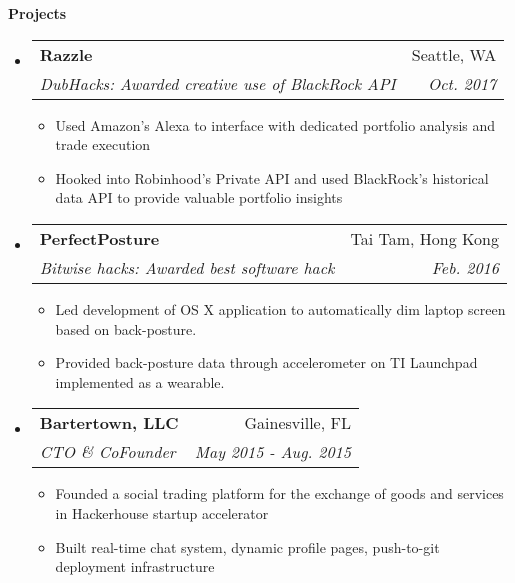 \documentclass[letterpaper,10pt]{article}
\makeatletter
\newcommand{\resitem}[1]{\item #1 \vspace{-2pt}}
\newcommand{\resheading}[1]{{\large \colorbox{mygrey}{\begin{minipage}{\textwidth}{\textbf{#1 \vphantom{p\^{E}}}}\end{minipage}}}}
\newcommand{\ressubheading}[4]{
\begin{tabular*}{7.0in}{l@{\extracolsep{\fill}}r}
		\textbf{#1} & #2 \\
		\textit{#3} & \textit{#4} \\
\end{tabular*}\vspace{-6pt}}
\makeatother
\begin{document}
\resheading{Projects}
\begin{itemize}
\item
	\ressubheading{Razzle}{Seattle, WA}{DubHacks: Awarded creative use of BlackRock API}{Oct. 2017}
	\begin{itemize}
		\resitem{Used Amazon's Alexa to interface with dedicated portfolio analysis and trade execution}
		\resitem{Hooked into Robinhood's Private API and used BlackRock's historical data API to provide valuable portfolio insights}
	\end{itemize}
\item
	\ressubheading{PerfectPosture}{Tai Tam, Hong Kong}{Bitwise hacks: Awarded best software hack}{Feb. 2016}
	\begin{itemize}
		\resitem{Led development of OS X application to automatically dim laptop screen based on back-posture.}
		\resitem{Provided back-posture data through accelerometer on TI Launchpad implemented as a wearable.}
	\end{itemize}
\item
	\ressubheading{Bartertown, LLC}{Gainesville, FL}{CTO \& CoFounder}{May 2015 - Aug. 2015}
	\begin{itemize}
		\resitem{Founded a social trading platform for the exchange of goods and services in Hackerhouse startup accelerator}
		\resitem{Built real-time chat system, dynamic profile pages, push-to-git deployment infrastructure}
	\end{itemize}

\end{itemize}
\end{document}
